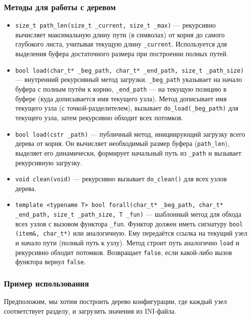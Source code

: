 \documentclass[a4paper,12pt]{article}
\begin{document}
\subsubsection{Методы для работы с деревом}

\begin{itemize}
    \item \texttt{size\_t path\_len(size\_t \_current, size\_t \_max)} — рекурсивно вычисляет максимальную длину пути (в символах) от корня до самого глубокого листа, учитывая текущую длину \texttt{\_current}. Используется для выделения буфера достаточного размера при построении полных путей.
    \item \texttt{bool load(char\_t* \_beg\_path, char\_t* \_end\_path, size\_t \_path\_size)} — внутренний рекурсивный метод загрузки. \texttt{\_beg\_path} указывает на начало буфера с полным путём к корню, \texttt{\_end\_path} — на текущую позицию в буфере (куда дописывается имя текущего узла). Метод дописывает имя текущего узла (с точкой-разделителем), вызывает \texttt{do\_load(\_beg\_path)} для текущего узла, затем рекурсивно обходит всех потомков.
    \item \texttt{bool load(cstr \_path)} — публичный метод, инициирующий загрузку всего дерева от корня. Он вычисляет необходимый размер буфера (\texttt{path\_len}), выделяет его динамически, формирует начальный путь из \texttt{\_path} и вызывает рекурсивную загрузку.
    \item \texttt{void clean(void)} — рекурсивно вызывает \texttt{do\_clean()} для всех узлов дерева.
    \item \texttt{template <typename T> bool forall(char\_t* \_beg\_path, char\_t* \_end\_path, size\_t \_path\_size, T \_fun)} — шаблонный метод для обхода всех узлов с вызовом функтора \texttt{\_fun}. Функтор должен иметь сигнатуру \texttt{bool (item\&, char\_t*)} или аналогичную. Ему передаётся ссылка на текущий узел и начало пути (полный путь к узлу). Метод строит путь аналогично \texttt{load} и рекурсивно обходит потомков. Возвращает \texttt{false}, если какой-либо вызов функтора вернул \texttt{false}.
\end{itemize}

\subsubsection{Пример использования}

Предположим, мы хотим построить дерево конфигурации, где каждый узел соответствует разделу, и загрузить значения из INI-файла.
\end{document}
